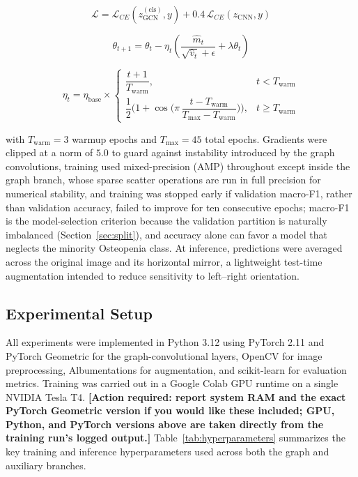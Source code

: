 \documentclass[conference]{IEEEtran}
\begin{document}
\begingroup
\small
\begin{equation}
\label{eq:loss}
\mathcal{L} = \mathcal{L}_{CE}(z_{\text{GCN}}^{(\text{cls})}, y) + 0.4\,\mathcal{L}_{CE}(z_{\text{CNN}}, y)
\end{equation}

\begin{equation}
\label{eq:adamw}
\theta_{t+1} = \theta_t - \eta_t \left( \frac{\hat{m}_t}{\sqrt{\hat{v}_t} + \epsilon} + \lambda \theta_t \right)
\end{equation}

\begin{equation}
\label{eq:schedule}
\eta_t = \eta_{\text{base}} \times
\begin{cases}
\dfrac{t+1}{T_{\text{warm}}}, & t < T_{\text{warm}} \\[4pt]
\dfrac{1}{2}\Big(1+\cos\Big(\pi\,\dfrac{t-T_{\text{warm}}}{T_{\max}-T_{\text{warm}}}\Big)\Big), & t \geq T_{\text{warm}}
\end{cases}
\end{equation}
\endgroup

with $T_{\text{warm}}=3$ warmup epochs and $T_{\max}=45$ total epochs. Gradients were clipped at a norm of $5.0$ to guard against instability introduced by the graph convolutions, training used mixed-precision (AMP) throughout except inside the graph branch, whose sparse scatter operations are run in full precision for numerical stability, and training was stopped early if validation macro-F1, rather than validation accuracy, failed to improve for ten consecutive epochs; macro-F1 is the model-selection criterion because the validation partition is naturally imbalanced (Section~\ref{sec:split}), and accuracy alone can favor a model that neglects the minority Osteopenia class. At inference, predictions were averaged across the original image and its horizontal mirror, a lightweight test-time augmentation intended to reduce sensitivity to left--right orientation.

\subsection{Experimental Setup}
\label{sec:expsetup}
All experiments were implemented in Python 3.12 using PyTorch 2.11 and PyTorch Geometric for the graph-convolutional layers, OpenCV for image preprocessing, Albumentations \cite{buslaev2020albumentations} for augmentation, and scikit-learn for evaluation metrics. Training was carried out in a Google Colab GPU runtime on a single NVIDIA Tesla T4. \textbf{[Action required: report system RAM and the exact PyTorch Geometric version if you would like these included; GPU, Python, and PyTorch versions above are taken directly from the training run's logged output.]} Table~\ref{tab:hyperparameters} summarizes the key training and inference hyperparameters used across both the graph and auxiliary branches.
\end{document}
